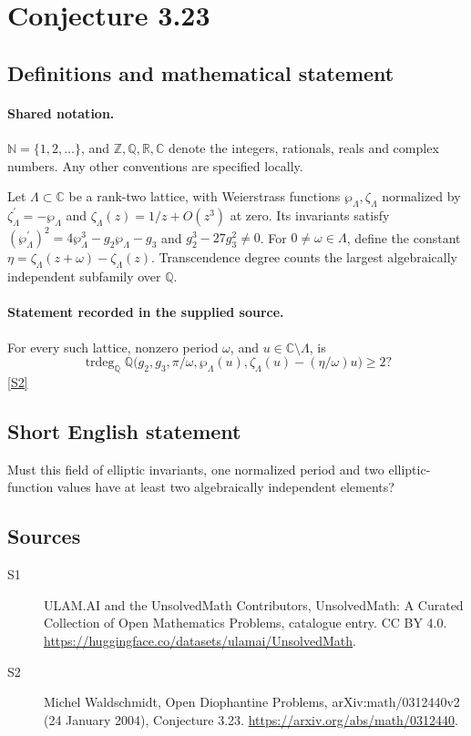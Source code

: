 \documentclass[11pt]{article}
\newcommand{\sref}[2]{\hyperlink{source:#1:#2}{[S#2]}}
\begin{document}
\section{Conjecture 3.23}\label{statement}

\subsection{Definitions and mathematical statement}

\paragraph{Shared notation.}$\mathbb N=\{1,2,\ldots\}$, and $\mathbb Z,\mathbb Q,\mathbb R,\mathbb C$ denote the integers, rationals, reals and complex numbers. Any other conventions are specified locally.


Let $\Lambda\subset\mathbb C$ be a rank-two lattice, with Weierstrass functions $\wp_\Lambda,\zeta_\Lambda$ normalized by $\zeta_\Lambda^{\prime}=-\wp_\Lambda$ and $\zeta_\Lambda(z)=1/z+O(z^3)$ at zero. Its invariants satisfy $(\wp_\Lambda^{\prime})^2=4\wp_\Lambda^3-g_2\wp_\Lambda-g_3$ and $g_2^3-27g_3^2\ne0$. For $0\ne\omega\in\Lambda$, define the constant $\eta=\zeta_\Lambda(z+\omega)-\zeta_\Lambda(z)$. Transcendence degree counts the largest algebraically independent subfamily over $\mathbb Q$.
\paragraph{Statement recorded in the supplied source.}
For every such lattice, nonzero period $\omega$, and $u\in\mathbb C\setminus\Lambda$, is \[\operatorname{trdeg}_{\mathbb Q}\mathbb Q\bigl(g_2,g_3,\pi/\omega,\wp_\Lambda(u),\zeta_\Lambda(u)-(\eta/\omega)u\bigr)\ge2?\] \sref{statement}{2}
\subsection{Short English statement}
Must this field of elliptic invariants, one normalized period and two elliptic-function values have at least two algebraically independent elements?
\subsection{Sources}
\begin{description}
\item[\hypertarget{source:statement:1}{S1}] ULAM.AI and the UnsolvedMath Contributors, UnsolvedMath: A Curated Collection of Open Mathematics Problems, catalogue entry. CC BY 4.0. \url{https://huggingface.co/datasets/ulamai/UnsolvedMath}.
\item[\hypertarget{source:statement:2}{S2}] Michel Waldschmidt, Open Diophantine Problems, arXiv:math/0312440v2 (24 January 2004), Conjecture 3.23. \url{https://arxiv.org/abs/math/0312440}.
\end{description}
\label{end:statement}
\end{document}
